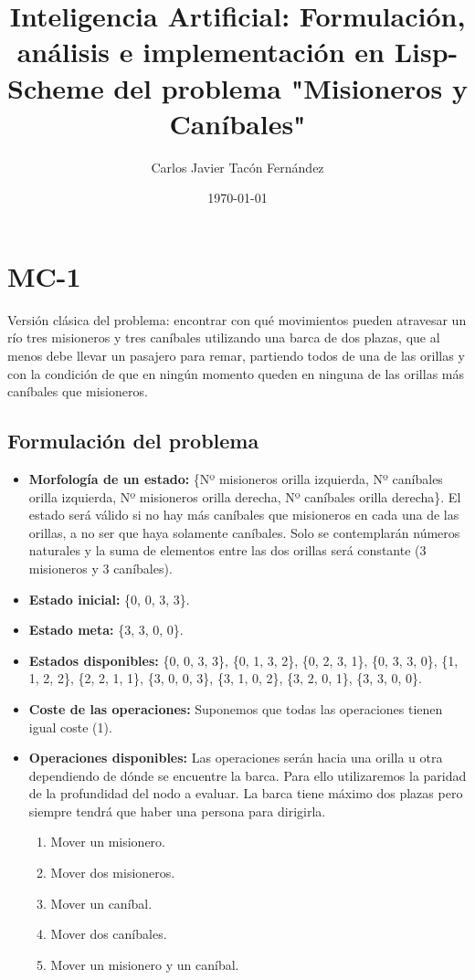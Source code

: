\documentclass{article}
\title{Inteligencia Artificial: Formulación, análisis e implementación en Lisp-Scheme del problema "Misioneros y Caníbales"}
\author{Carlos Javier Tacón Fernández}
\date{\today}
\begin{document}
\begin{titlepage}
  \thispagestyle{empty}
  \maketitle
\end{titlepage}

\tableofcontents
\pagebreak

\section{MC-1}
Versión clásica del problema: encontrar con qué movimientos pueden atravesar un río tres misioneros y tres caníbales utilizando una barca de dos plazas, que al menos debe llevar un pasajero para remar, partiendo todos de una de las orillas y con la condición de que en ningún momento queden en ninguna de las orillas más caníbales que misioneros.

\subsection{Formulación del problema}
\begin{itemize}
  \item \textbf{Morfología de un estado:} \{Nº misioneros orilla izquierda, Nº caníbales orilla izquierda, Nº misioneros orilla derecha, Nº caníbales orilla derecha\}. El estado será válido si no hay más caníbales que misioneros en cada una de las orillas, a no ser que haya solamente caníbales. Solo se contemplarán números naturales y la suma de elementos entre las dos orillas será constante (3 misioneros y 3 caníbales).
  \item \textbf{Estado inicial:} \{0, 0, 3, 3\}.
  \item \textbf{Estado meta:} \{3, 3, 0, 0\}.
  \item \textbf{Estados disponibles:} \{0, 0, 3, 3\}, \{0, 1, 3, 2\}, \{0, 2, 3, 1\}, \{0, 3, 3, 0\}, \{1, 1, 2, 2\}, \{2, 2, 1, 1\}, \{3, 0, 0, 3\}, \{3, 1, 0, 2\}, \{3, 2, 0, 1\}, \{3, 3, 0, 0\}.
  \item \textbf{Coste de las operaciones:} Suponemos que todas las operaciones tienen igual coste (1).
  \item \textbf{Operaciones disponibles:} Las operaciones serán hacia una orilla u otra dependiendo de dónde se encuentre la barca. Para ello utilizaremos la paridad de la profundidad del nodo a evaluar. La barca tiene máximo dos plazas pero siempre tendrá que haber una persona para dirigirla.
  \begin{enumerate}
    \item Mover un misionero.
    \item Mover dos misioneros.
    \item Mover un caníbal.
    \item Mover dos caníbales.
    \item Mover un misionero y un caníbal.
  \end{enumerate}
\end{itemize}
\end{document}
